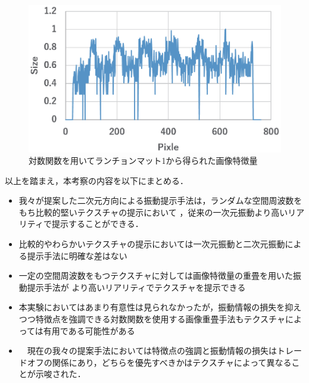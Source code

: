 \begin{figure}[h]
\begin{center}
  \includegraphics[width=15cm]{mat1_log.eps}
  \caption{対数関数を用いてランチョンマット1から得られた画像特徴量}
  \label{log}
\end{center}
\end{figure}


以上を踏まえ，本考察の内容を以下にまとめる．
\begin{itemize}
  \item 我々が提案した二次元方向による振動提示手法は，ランダムな空間周波数をもち比較的堅いテクスチャの提示において
，従来の一次元振動より高いリアリティで提示することができる．
  \item 比較的やわらかいテクスチャの提示においては一次元振動と二次元振動による提示手法に明確な差はない
  \item 一定の空間周波数をもつテクスチャに対しては画像特徴量の重畳を用いた振動提示手法が
より高いリアリティでテクスチャを提示できる
  \item 本実験においてはあまり有意性は見られなかったが，振動情報の損失を抑えつつ特徴点を強調できる対数関数を使用する画像重畳手法もテクスチャによっては有用である可能性がある
　\item　現在の我々の提案手法においては特徴点の強調と振動情報の損失はトレードオフの関係にあり，どちらを優先すべきかはテクスチャによって異なることが示唆された．
\end{itemize}

